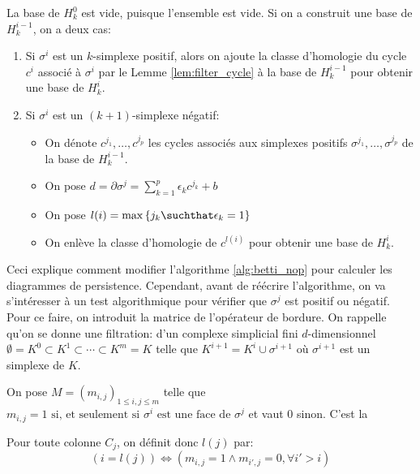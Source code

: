 La base de $H_{k}^{0}$ est vide, puisque l'ensemble est vide.
Si on a construit une base de $H_{k}^{i - 1}$, on a deux cas:
\begin{enumerate}
	\item Si $\sigma^{i}$ est un $k$-simplexe positif, alors on ajoute la classe d'homologie du cycle
	      $c^{i}$ associé à $\sigma^{i}$ par le Lemme \ref{lem:filter_cycle} à la base de
	      $H_{k}^{i - 1}$ pour obtenir une base de $H_{k}^{i}$.
	\item Si $\sigma^{i}$ est un $(k + 1)$-simplexe négatif:
	      \begin{itemize}
		      \item On dénote $c^{j_{1}}, \ldots, c^{j_{p}}$ les cycles associés aux simplexes
		            positifs $\sigma^{j_{1}}, \ldots, \sigma^{j_{p}}$ de la base de $H_{k}^{i - 1}$.
		      \item On pose $d = \partial \sigma^{j} = \sum_{k = 1}^{p}\epsilon_{k}c^{j_{k}} + b$
		      \item On pose $l(i) = \max \left\{j_{k} \suchthat \epsilon_{k} = 1\right\}$
		      \item On enlève la classe d'homologie de $c^{l(i)}$ pour obtenir une base de $H_{k}^{i}$.
	      \end{itemize}
\end{enumerate}

Ceci explique comment modifier l'algorithme \ref{alg:betti_nop} pour calculer les diagrammes de persistence.
Cependant, avant de réécrire l'algorithme, on va s'intéresser à un test algorithmique pour vérifier que $\sigma^{j}$ est positif ou négatif.
Pour ce faire, on introduit la matrice de l'opérateur de bordure. On rappelle qu'on se donne une filtration:
d'un complexe simplicial fini $d$-dimensionnel
$\emptyset = K^{0} \subset K^{1} \subset \cdots \subset K^{m} = K$ telle que
$K^{i + 1} = K^{i} \cup \sigma^{i + 1}$ où $\sigma^{i + 1}$ est un simplexe de $K$.

\begin{definition}
	On pose $M = \left(m_{i, j}\right)_{1\leq i, j \leq m}$ telle que $m_{i, j} = 1 \text{ si, et seulement si } \sigma^{i} \text{ est une face de } \sigma^{j}$ et vaut $0$ sinon.
	C'est la 
\end{definition}
Pour toute colonne $C_{j}$, on définit donc $l(j)$ par:
\begin{equation*}
	(i = l(j)) \Leftrightarrow (m_{i, j} = 1 \land m_{i', j} = 0, \forall i' > i)
\end{equation*}

